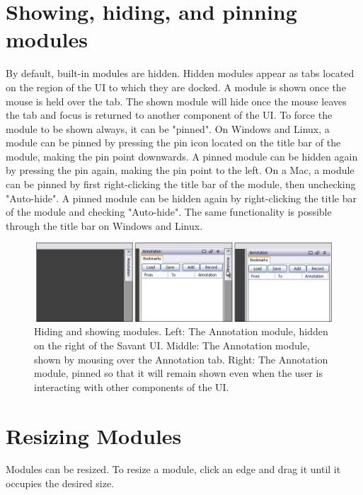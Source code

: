 \documentclass{report}
\begin{document}
\section{Showing, hiding, and pinning modules}

By default, built-in modules are hidden. Hidden modules appear as tabs located on the region of the UI to which they are docked. A module is shown once the mouse is held over the tab. The shown module will hide once the mouse leaves the tab and focus is returned to another component of the UI. To force the module to be shown always, it can be "pinned". On Windows and Linux, a module can be pinned by pressing the pin icon located on the title bar of the module, making the pin point downwards. A pinned module can be hidden again by pressing the pin again, making the pin point to the left. On a Mac, a module can be pinned by first right-clicking the title bar of the module, then unchecking "Auto-hide". A pinned module can be hidden again by right-clicking the title bar of the module and checking "Auto-hide". The same functionality is possible through the title bar on Windows and Linux.

\begin{figure}[!h]
\begin{center}
\includegraphics[type=png,ext=.png,read=.png,width=14cm]{images/hideshowmodules}
\caption{Hiding and showing modules. Left: The Annotation module, hidden on the right of the Savant UI. Middle: The Annotation module, shown by mousing over the Annotation tab. Right: The Annotation module, pinned so that it will remain shown even when the user is interacting with other components of the UI. }
\label{rangecontrolpanel}
\end{center}
\end{figure}

\section{Resizing Modules}

Modules can be resized. To resize a module, click an edge and drag it until it occupies the desired size. 
\end{document}

